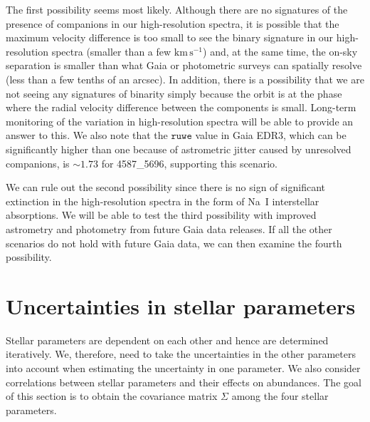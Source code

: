 \documentclass{aa}
\begin{document}
\begin{appendix}
The first possibility seems most likely.
Although there are no signatures of the presence of companions in our high-resolution spectra, it is possible that the maximum velocity difference is too small to see the binary signature in our high-resolution spectra (smaller than a few $\mathrm{km\,s^{-1}}$) and, at the same time, the on-sky separation is smaller than what Gaia or photometric surveys can spatially resolve (less than a few tenths of an arcsec).
In addition, there is a possibility that we are not seeing any signatures of binarity simply because the orbit is at the phase where the radial velocity difference between the components is small. Long-term monitoring of the variation in high-resolution spectra will be able to provide an answer to this.
We also note that the $\texttt{ruwe}$ value in Gaia EDR3, which can be significantly higher than one because of astrometric jitter caused by unresolved companions, is $\sim 1.73$ for 4587\_5696, supporting this scenario.



We can rule out the second possibility since there is no sign of significant extinction in the high-resolution spectra in the form of Na~I interstellar absorptions.
We will be able to test the third possibility with improved astrometry and photometry from future Gaia data releases.
If all the other scenarios do not hold with future Gaia data, we can then examine the fourth possibility.


\section{Uncertainties in stellar parameters\label{app:uncertainty}}

Stellar parameters are dependent on each other and hence are determined iteratively.
We, therefore, need to take the uncertainties in the other parameters into account when estimating the uncertainty in one parameter.
We also consider correlations between stellar parameters and their effects on abundances.
The goal of this section is to obtain the covariance matrix $\Sigma$ among the four stellar parameters.


\end{appendix}
\end{document}
